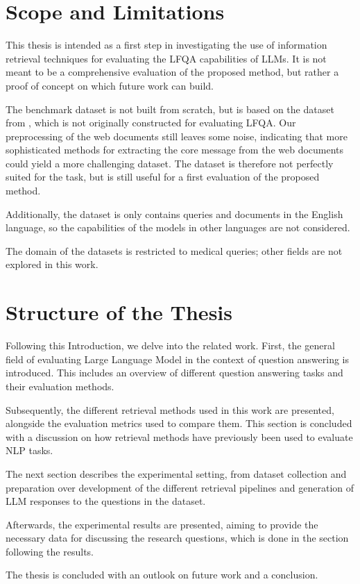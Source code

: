\section{Scope and Limitations}\label{sec:scope-and-limitations}
This thesis is intended as a first step in investigating the use of information retrieval techniques for evaluating the LFQA capabilities of LLMs.
It is not meant to be a comprehensive evaluation of the proposed method, but rather a proof of concept on which future work can build.

The benchmark dataset is not built from scratch, but is based on the dataset from \cite{goeuriot:2021:Consumer}, which is not originally constructed for evaluating LFQA.
Our preprocessing of the web documents still leaves some noise, indicating that more sophisticated methods for extracting the core message from the web documents could yield a more challenging dataset.
The dataset is therefore not perfectly suited for the task, but is still useful for a first evaluation of the proposed method.

Additionally, the dataset is only contains queries and documents in the English language, so the capabilities of the models in other languages are not considered.

The domain of the datasets is restricted to medical queries; other fields are not explored in this work.

\section{Structure of the Thesis}\label{sec:structure-of-the-thesis}
Following this Introduction, we delve into the related work.
First, the general field of evaluating Large Language Model in the context of question answering is introduced.
This includes an overview of different question answering tasks and their evaluation methods.

Subsequently, the different retrieval methods used in this work are presented, alongside the evaluation metrics used to compare them.
This section is concluded with a discussion on how retrieval methods have previously been used to evaluate NLP tasks.

The next section describes the experimental setting, from dataset collection and preparation over development of the different retrieval pipelines and generation of LLM responses to the questions in the dataset.

Afterwards, the experimental results are presented, aiming to provide the necessary data for discussing the research questions, which is done in the section following the results.

The thesis is concluded with an outlook on future work and a conclusion.